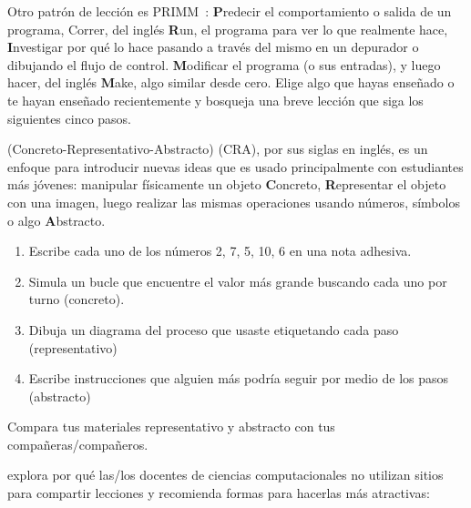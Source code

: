 Otro patrón de lección es PRIMM~\cite{Sent2019}:
\textbf{P}redecir el comportamiento o salida de un programa,
Correr, del inglés \textbf{R}un, el programa para ver lo que realmente hace,
\textbf{I}nvestigar por qué lo hace pasando a través del mismo en un depurador o dibujando el flujo de control.
\textbf{M}odificar el programa (o sus entradas),
y luego hacer, del inglés \textbf{M}ake, algo similar desde cero.
Elige algo que hayas enseñado o te hayan enseñado recientemente
y bosqueja una breve lección que siga los siguientes cinco pasos.
 
 
 
 (Concreto-Representativo-Abstracto) (CRA), por sus siglas en inglés, es un enfoque para introducir nuevas ideas
que es usado principalmente con estudiantes más jóvenes:
manipular físicamente un objeto \textbf{C}oncreto,
\textbf{R}epresentar el objeto con una imagen,
luego realizar las mismas operaciones
usando números, símbolos o algo \textbf{A}bstracto.
 \begin{enumerate}
 
\item
  Escribe cada uno de los números 2, 7, 5, 10, 6 en una nota adhesiva.
 
\item
  Simula un bucle que encuentre el valor más grande buscando cada uno por turno (concreto).
 
\item
 Dibuja un diagrama del proceso que usaste etiquetando cada paso (representativo)
 
\item
  Escribe instrucciones que alguien más podría seguir por medio de los pasos (abstracto)
\end{enumerate}
 
 
Compara tus materiales representativo y abstracto con tus compañeras/compañeros.
 
 
\cite{Leak2017} explora por qué las/los docentes de ciencias computacionales
no utilizan sitios para compartir lecciones y recomienda formas para hacerlas más atractivas:
 

